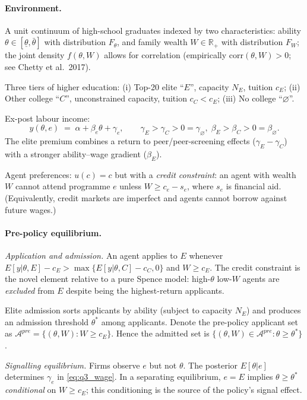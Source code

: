 \documentclass[11pt,a4paper]{article}
\begin{document}
\paragraph{Environment.}
A unit continuum of high-school graduates indexed by two characteristics: ability $\theta\in[\underline\theta,\bar\theta]$ with distribution $F_{\theta}$, and family wealth $W\in\mathbb{R}_{+}$ with distribution $F_{W}$; the joint density $f(\theta,W)$ allows for correlation (empirically $\mathrm{corr}(\theta,W)>0$; see Chetty et al.\ 2017).

Three tiers of higher education: (i) Top-20 elite ``$E$'', capacity $N_{E}$, tuition $c_{E}$; (ii) Other college ``$C$'', unconstrained capacity, tuition $c_{C}<c_{E}$; (iii) No college ``$\varnothing$''.

Ex-post labour income:
\begin{equation}
y(\theta,e)\;=\;\alpha+\beta_{e}\theta+\gamma_{e},\qquad \gamma_{E}>\gamma_{C}>0=\gamma_{\varnothing},\;\beta_{E}>\beta_{C}>0=\beta_{\varnothing}.
\label{eq:q3_wage}
\end{equation}
The elite premium combines a return to peer/peer-screening effects ($\gamma_{E}-\gamma_{C}$) with a stronger ability--wage gradient ($\beta_{E}$).

Agent preferences: $u(c)=c$ but with a \emph{credit constraint}: an agent with wealth $W$ cannot attend programme $e$ unless $W\ge c_{e}-s_{e}$, where $s_{e}$ is financial aid. (Equivalently, credit markets are imperfect and agents cannot borrow against future wages.)

\paragraph{Pre-policy equilibrium.}
\emph{Application and admission.} An agent applies to $E$ whenever $E[y|\theta,E]-c_{E}>\max\{E[y|\theta,C]-c_{C},0\}$ and $W\ge c_{E}$. The credit constraint is the novel element relative to a pure Spence model: high-$\theta$ low-$W$ agents are \emph{excluded} from $E$ despite being the highest-return applicants.

Elite admission sorts applicants by ability (subject to capacity $N_{E}$) and produces an admission threshold $\theta^{*}$ among applicants. Denote the pre-policy applicant set as $\mathcal{A}^{pre}=\{(\theta,W):W\ge c_{E}\}$. Hence the admitted set is $\{(\theta,W)\in\mathcal{A}^{pre}:\theta\ge\theta^{*}\}$.

\emph{Signalling equilibrium.} Firms observe $e$ but not $\theta$. The posterior $E[\theta|e]$ determines $\gamma_{e}$ in \eqref{eq:q3_wage}. In a separating equilibrium, $e=E$ implies $\theta\ge\theta^{*}$ \emph{conditional} on $W\ge c_{E}$; this conditioning is the source of the policy's signal effect.
\end{document}
